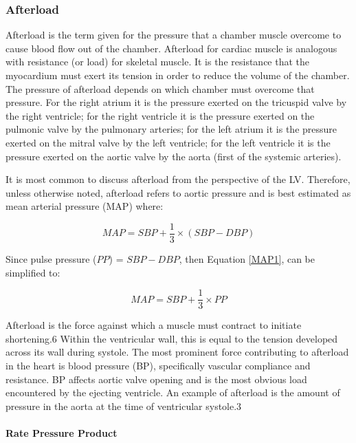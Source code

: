 \subsubsection{Afterload}
Afterload is the term given for the pressure that a chamber muscle overcome to cause blood flow out of the chamber. Afterload for cardiac muscle is analogous with resistance (or load) for skeletal muscle. It is the resistance that the myocardium must exert its tension in order to reduce the volume of the chamber. The pressure of afterload depends on which chamber must overcome that pressure. For the right atrium it is the pressure exerted on the tricuspid valve by the right ventricle; for the right ventricle it is the pressure exerted on the pulmonic valve by the pulmonary arteries; for the left atrium it is the pressure exerted on the mitral valve by the left ventricle; for the left ventricle it is the pressure exerted on the aortic valve by the aorta (first of the systemic arteries). 

It is most common to discuss afterload from the perspective of the LV. Therefore, unless otherwise noted, afterload refers to aortic pressure and is best estimated as mean arterial pressure (MAP) where: 

\begin{equation}
    MAP = SBP + \frac{1}{3} \times (SBP - DBP)
    \label{MAP1}
\end{equation}

Since pulse pressure ($PP$) = $SBP - DBP$, then Equation \ref{MAP1}, can be simplified to:

\begin{equation}
    MAP = SBP + \frac{1}{3} \times PP
    \label{MAP2}
\end{equation}

Afterload is the force against which a muscle must contract to initiate shortening.6 Within the ventricular wall, this is equal to the tension developed across its wall during systole. The most prominent force contributing to afterload in the heart is blood pressure (BP), specifically vascular compliance and resistance. BP affects aortic valve opening and is the most obvious load encountered by the ejecting ventricle. An example of afterload is the amount of pressure in the aorta at the time of ventricular systole.3


\paragraph{Rate Pressure Product}

